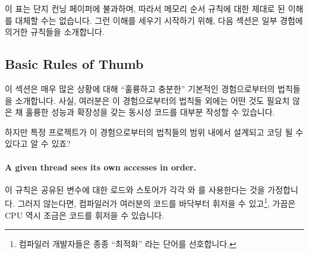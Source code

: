 이 표는 단지 컨닝 페이퍼에 불과하며, 따라서 메모리 순서 규칙에 대한 제대로 된
이해를 대체할 수는 없습니다.
그런 이해를 세우기 시작하기 위해, 다음 섹션은 일부 경험에 의거한 규칙들을
소개합니다.

\subsection{Basic Rules of Thumb}
\label{sec:memorder:Basic Rules of Thumb}

이 섹션은 매우 많은 상황에 대해 ``훌륭하고 충분한'' 기본적인 경험으로부터의
법칙들을 소개합니다.
사실, 여러분은 이 경험으로부터의 법칙들 외에는 어떤 것도 필요치 않은 채 훌륭한
성능과 확장성을 갖는 동시성 코드를 대부분 작성할 수 있습니다.

\QuickQuiz{}
	하지만 특정 프로젝트가 이 경험으로부터의 법칙들의 범위 내에서 설계되고
	코딩 될 수 있다고 알 수 있죠?

\QuickQuizAnswer{
	이 챕터의 나머지 부분들의 대부분의 목적은 정확히 이 질문에 답하는
	것입니다!

} \QuickQuizEnd

\paragraph{A given thread sees its own accesses in order.}
이 규칙은 공유된 변수에 대한 로드와 스토어가 각각  와
 를 사용한다는 것을 가정합니다.
그러지 않는다면, 컴파일러가 여러분의 코드를 바닥부터 휘저을 수 있고\footnote{
	컴파일러 개발자들은 종종 ``최적화'' 라는 단어를 선호합니다.}, 가끔은
CPU 역시 조금은 코드를 휘저을 수 있습니다.

